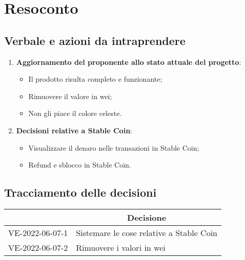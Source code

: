\section{Resoconto}
\subsection{Verbale e azioni da intraprendere}

\begin{enumerate}
	\item \textbf{Aggiornamento del proponente allo stato attuale del progetto}:
	\begin{itemize}
		\item Il prodotto risulta completo e funzionante;
		\item Rimuovere il valore in wei;
		\item Non gli piace il colore celeste.
	\end{itemize}
	\item \textbf{Decisioni relative a Stable Coin}:
	\begin{itemize}
		\item Visualizzare il denaro nelle transazioni in Stable Coin;
		\item Refund e sblocco in Stable Coin.
	\end{itemize}
\end{enumerate}

\pagebreak

\subsection{Tracciamento delle decisioni}

\begin{table}[H]
	\centering
	\renewcommand{\arraystretch}{1.8}
	\begin{tabular}{c | p{10cm}}
		\rowcolor[HTML]{125E28}
		\multicolumn{1}{c}{\color[HTML]{FFFFFF} \textbf{ID}} &
		\multicolumn{1}{c}{\color[HTML]{FFFFFF} \textbf{Decisione}} \\
		\hline
		VE-2022-06-07-1 & Sistemare le cose relative a Stable Coin \\ \hline
		VE-2022-06-07-2 & Rimuovere i valori in wei \\ \hline
	\end{tabular}
\end{table}